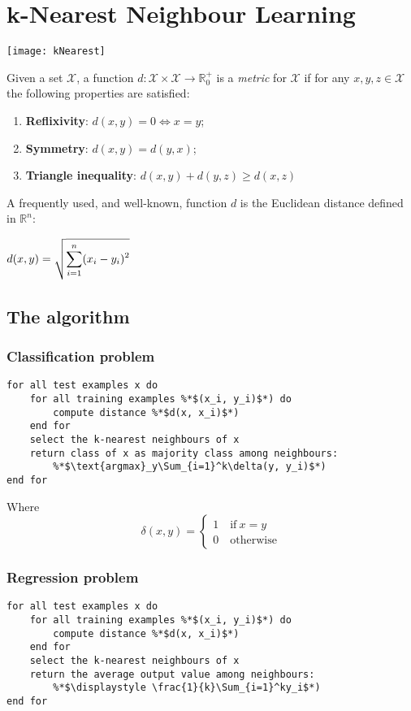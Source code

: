 \chapter{k-Nearest Neighbour Learning}
\begin{center}
	\texttt{[image: kNearest]}
\end{center}
\begin{definition}[Metrics]
Given a set $\mathcal{X}$, a function $d:\mathcal{X}\times\mathcal{X}\rightarrow\mathbb{R}_0^+$ is a \textit{metric} for $\mathcal{X}$ if for any $x, y, z\in\mathcal{X}$ the following properties are satisfied:
\begin{enumerate}
	\item \textbf{Reflixivity}: $d(x,y)=0 \iff x=y$;
	\item \textbf{Symmetry}: $d(x,y)=d(y,x)$;
	\item \textbf{Triangle inequality}: $d(x,y)+d(y,z)\geq d(x,z)$
\end{enumerate}
\end{definition}
A frequently used, and well-known, function $d$ is the Euclidean distance defined in $\mathbb{R}^n$:
\begin{center}
	$\displaystyle d(x, y)=\sqrt{\displaystyle\sum_{i=1}^n(x_i-y_i)^2}$
\end{center}
%
%
%
\section{The algorithm}
%
%
\subsection{Classification problem}
\begin{lstlisting}
for all test examples x do
	for all training examples %*$(x_i, y_i)$*) do
		compute distance %*$d(x, x_i)$*)
	end for
	select the k-nearest neighbours of x
	return class of x as majority class among neighbours:
		%*$\text{argmax}_y\Sum_{i=1}^k\delta(y, y_i)$*)
end for
\end{lstlisting}
Where 
\[
\delta(x,y)=
\begin{cases}
	1\quad \text{if}~x=y\\
	0\quad \text{otherwise}
\end{cases}
\]
%
%
\subsection{Regression problem}
\begin{lstlisting}
for all test examples x do
	for all training examples %*$(x_i, y_i)$*) do
		compute distance %*$d(x, x_i)$*)
	end for
	select the k-nearest neighbours of x
	return the average output value among neighbours:
		%*$\displaystyle \frac{1}{k}\Sum_{i=1}^ky_i$*)
end for
\end{lstlisting}
%
%
%
